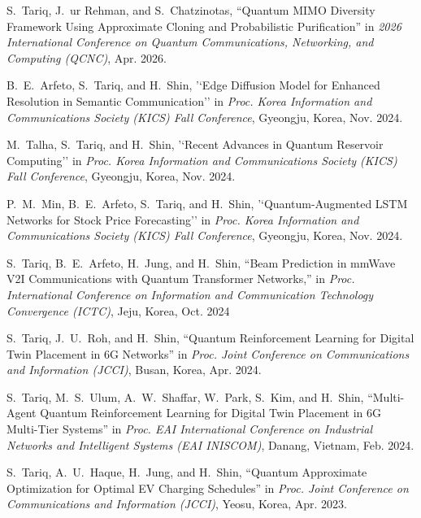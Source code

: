 \documentclass[10pt]{article}
\begin{document}
\begin{enumerate}[ {[}1{]} ]
\item S.~Tariq, J.~ur Rehman, and S.~Chatzinotas, “Quantum MIMO Diversity Framework Using Approximate Cloning and Probabilistic Purification'' in \emph{2026 International Conference on Quantum Communications, Networking, and Computing (QCNC)}, Apr. 2026.

\item
B.~E.~Arfeto, S.~Tariq, and H.~Shin, '`Edge Diffusion Model for Enhanced Resolution in Semantic Communication'' in \emph{Proc. Korea Information and Communications Society (KICS) Fall Conference}, Gyeongju, Korea, Nov. 2024.

\item
M.~Talha, S.~Tariq, and H.~Shin, '`Recent Advances in Quantum Reservoir Computing'' in \emph{Proc. Korea Information and Communications Society (KICS) Fall Conference}, Gyeongju, Korea, Nov. 2024.

\item
P.~M.~Min, B.~E.~Arfeto, S.~Tariq, and H.~Shin, '`Quantum-Augmented LSTM Networks for Stock Price Forecasting'' in \emph{Proc. Korea Information and Communications Society (KICS) Fall Conference}, Gyeongju, Korea, Nov. 2024.

\item
S.~Tariq, B.~E.~Arfeto, H.~Jung, and H.~Shin, ``Beam Prediction in mmWave V2I Communications
with Quantum Transformer Networks,'' in \emph{Proc. International Conference on Information and Communication Technology Convergence (ICTC)}, Jeju, Korea, Oct. 2024

\item

S.~Tariq, J.~U.~Roh, and H.~Shin, ``Quantum Reinforcement Learning
for Digital Twin Placement in 6G Networks'' in \emph{Proc. Joint Conference on Communications and Information (JCCI)}, Busan, Korea, Apr. 2024.


\item

S.~Tariq, M.~S.~Ulum, A.~W.~Shaffar, W.~Park, S.~Kim, and H.~Shin, ``Multi-Agent Quantum Reinforcement Learning
for Digital Twin Placement in 6G Multi-Tier
Systems'' in \emph{Proc. EAI International Conference on Industrial Networks and Intelligent Systems (EAI INISCOM)}, Danang, Vietnam, Feb. 2024.


\item

S.~Tariq, A.~U.~Haque, H.~Jung, and H.~Shin, ``Quantum Approximate Optimization for Optimal
EV Charging Schedules'' in \emph{Proc. Joint Conference on Communications and Information (JCCI)}, Yeosu, Korea, Apr. 2023.



\end{enumerate}
\end{document}
